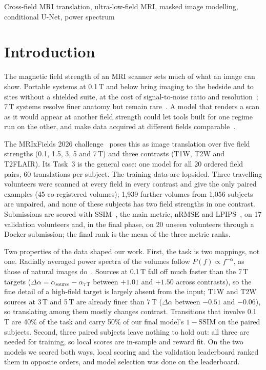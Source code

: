 \documentclass[conference]{IEEEtran}
\begin{document}
\begin{IEEEkeywords}
Cross-field MRI translation, ultra-low-field MRI, masked image modelling, conditional U-Net,
power spectrum
\end{IEEEkeywords}

\section{Introduction}

The magnetic field strength of an MRI scanner sets much of what an image can show. Portable
systems at 0.1\,T and below bring imaging to the bedside and to sites without a shielded suite,
at the cost of signal-to-noise ratio and resolution~\cite{sheth2021portable,arnold2023lowfield};
7\,T systems resolve finer anatomy but remain rare~\cite{ladd2018ultrahigh}. A model that renders
a scan as it would appear at another field strength could let tools built for one regime run on
the other, and make data acquired at different fields comparable~\cite{iglesias2023synthsr}.

The MRIxFields 2026 challenge~\cite{mrixfields2026} poses this as image translation over five
field strengths (0.1, 1.5, 3, 5 and 7\,T) and three contrasts (T1W, T2W and T2FLAIR). Its Task~3
is the general case: one model for all 20 ordered field pairs, 60 translations per subject. The
training data are lopsided. Three travelling volunteers were scanned at every field in every
contrast and give the only paired examples (45 co-registered volumes); 1{,}939 further volumes
from 1{,}056 subjects are unpaired, and none of these subjects has two field strengths in one
contrast. Submissions are scored with SSIM~\cite{wang2004ssim}, the main metric, nRMSE and
LPIPS~\cite{zhang2018lpips}, on 17 validation volunteers and, in the final phase, on 20 unseen
volunteers through a Docker submission; the final rank is the mean of the three metric ranks.

Two properties of the data shaped our work. First, the task is two mappings, not one. Radially
averaged power spectra of the volumes follow $P(f)\propto f^{-\alpha}$, as those of natural
images do~\cite{vanderschaaf1996power}. Sources at 0.1\,T fall off much faster than the 7\,T
targets ($\Delta\alpha = \alpha_{\text{source}} - \alpha_{7\,\mathrm{T}}$ between $+1.01$ and
$+1.50$ across contrasts), so the fine detail of a high-field target is largely absent from the
input; T1W and T2W sources at 3\,T and 5\,T are already finer than 7\,T ($\Delta\alpha$ between
$-0.51$ and $-0.06$), so translating among them mostly changes contrast. Transitions that
involve 0.1\,T are 40\% of the task and carry 50\% of our final model's $1-\mathrm{SSIM}$ on
the paired subjects. Second, three paired subjects leave nothing to hold out: all three are
needed for training, so local scores are in-sample and reward fit. On the two models we scored
both ways, local scoring and the validation leaderboard ranked them in opposite orders, and
model selection was done on the leaderboard.
\end{document}
